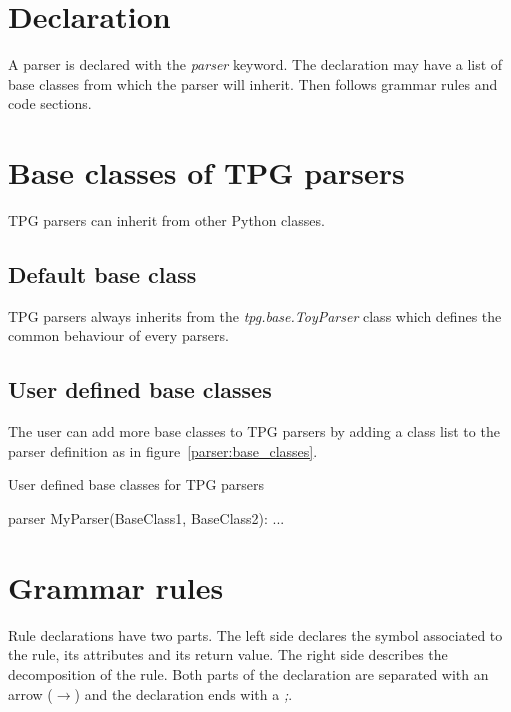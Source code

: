 \section{Declaration}

A parser is declared with the \emph{parser} keyword.
The declaration may have a list of base classes from which the parser will inherit.
Then follows grammar rules and code sections.

\section{Base classes of TPG parsers}
\label{parser:inheritance}

TPG parsers can inherit from other Python classes.

\subsection{Default base class}

TPG parsers always inherits from the \emph{tpg.base.ToyParser} class which defines the common behaviour of every parsers.

\subsection{User defined base classes}

The user can add more base classes to TPG parsers by adding a class list to the parser definition as in figure~\ref{parser:base_classes}.

\begin{code}
\caption{User defined base classes for TPG parsers} \label{parser:base_classes}
\begin{verbatimtab}[4]
parser MyParser(BaseClass1, BaseClass2):
	...
\end{verbatimtab}
\end{code}

\section{Grammar rules}
\label{parser:grammar_rules}

Rule declarations have two parts.
The left side declares the symbol associated to the rule, its attributes and its return value.
The right side describes the decomposition of the rule.
Both parts of the declaration are separated with an arrow (\emph{$\to$})
and the declaration ends with a \emph{;}.

